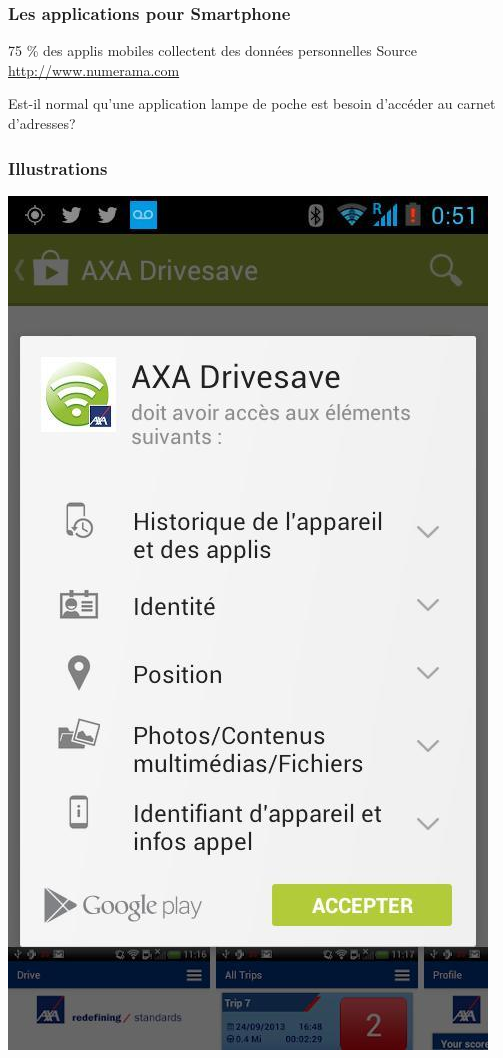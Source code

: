 \documentclass{beamer}
\begin{document}
\begin{frame}
\frametitle{Les applications pour Smartphone}
\begin{block}{75 \% des applis mobiles collectent des données personnelles}
Source \url{http://www.numerama.com}
\end{block}
Est-il normal qu'une application lampe de poche est besoin d'accéder au carnet d'adresses?
\end{frame}

\begin{frame}
\frametitle{Illustrations}
\begin{center}
\includegraphics[scale=0.3]{./images/AXA_assurance_gps.jpg}
\end{center}
\end{frame}
\end{document}
